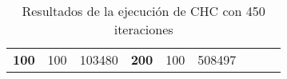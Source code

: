 \begin{table}[H]
\begin{tabular}{|ccrccrccc}
\multicolumn{1}{|c|}{\multirow{-39}{*}{\cellcolor[HTML]{FFFFC7}\textbf{100}}} & \multicolumn{1}{c|}{\multirow{-9}{*}{\cellcolor[HTML]{DDFDFF}100}} & \multicolumn{1}{r|}{\cellcolor[HTML]{DAE8FC}103480}    & \multicolumn{1}{c|}{\multirow{-39}{*}{\cellcolor[HTML]{FFFFC7}\textbf{200}}} & \multicolumn{1}{c|}{\multirow{-10}{*}{\cellcolor[HTML]{DDFDFF}100}} & \multicolumn{1}{r|}{\cellcolor[HTML]{DDFDFF}508497}    &                                                                              &                                                                    &                                                        \\ \cline{1-6}
\end{tabular}
\caption{\label{CHC450}Resultados de la ejecución de CHC con 450 iteraciones}
\end{table}

